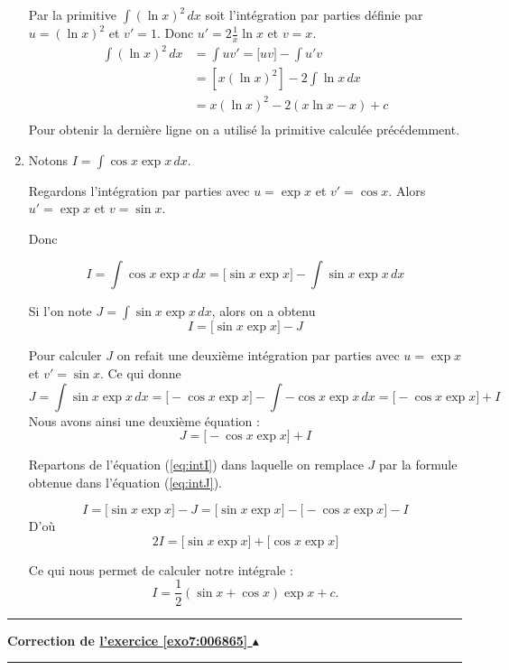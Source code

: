 \documentclass[11pt,a4paper]{article}
\newcounter{exo}
\newcommand{\correction}[1]{\hypertarget{cor7:#1}{}\label{cor7:#1}{\bf Correction de \hyperlink{exo7:#1}{l'exercice \ref{exo7:#1} $\blacktriangle$}}\vspace{1mm}\hrule\vspace{1mm}}
\newcommand{\fincorrection}{\vspace{1mm}\hrule\vspace*{7mm}}
\begin{document}
\begin{enumerate}
\bigskip

Par la primitive $\int (\ln x)^2 \, dx$ soit l'intégration par parties définie par $u=(\ln x)^2$ et  $v'=1$.
Donc $u' = 2 \frac 1x \ln x$ et $v=x$.
\begin{align*}
\int (\ln x)^2 \, dx
&= \int uv' = \big[ uv \big] - \int u'v \\
&= \left[ x (\ln x)^2 \right] - 2 \int \ln x \, dx \\
&= x(\ln x)^2 -2 (x\ln x - x) + c \\
\end{align*}
Pour obtenir la dernière ligne on a utilisé la primitive calculée précédemment.

  \item Notons $I=\int \cos x\exp x \, dx$.

Regardons l'intégration par parties avec $u=\exp x$ et $v'=\cos x$.
Alors  $u' = \exp x$ et $v=\sin x$.

Donc

$$I = \int \cos x\exp x \,dx= \big[ \sin x \exp x \big] - \int \sin x \exp x\,dx$$

Si l'on note $J = \int \sin x \exp x\,dx$, alors on a obtenu
\begin{equation}
\label{eq:intI}
I = \big[ \sin x \exp x \big] - J  
\end{equation}
 
Pour calculer $J$ on refait une deuxième intégration par parties
avec  $u=\exp x$ et $v'=\sin x$.
Ce qui donne
$$J = \int \sin x \exp x\,dx = \big[ -\cos x \exp x \big] - \int -\cos x \exp x\,dx
= \big[ -\cos x \exp x \big] + I$$
Nous avons ainsi une deuxième équation :
\begin{equation}
\label{eq:intJ}
J = \big[ -\cos x \exp x \big] + I
\end{equation}

Repartons de l'équation (\ref{eq:intI}) dans laquelle on remplace $J$ par la formule obtenue dans l'équation 
(\ref{eq:intJ}).


$$I=\big[ \sin x \exp x \big] - J  = \big[ \sin x \exp x \big] - \big[ -\cos x \exp x \big] - I$$
D'où
$$2I = \big[ \sin x \exp x \big] + \big[ \cos x \exp x \big]$$

Ce qui nous permet de calculer notre intégrale :
$$I= \frac12 (\sin x + \cos x) \exp x + c.$$
\end{enumerate}
\fincorrection
\correction{006865}
\end{document}
